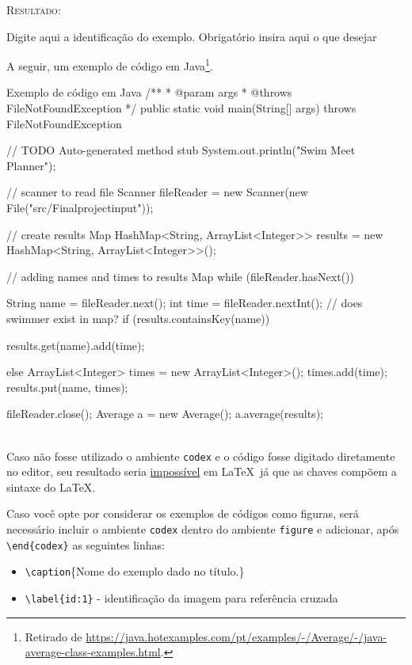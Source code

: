\documentclass[a4paper,12pt,oneside,openright,extrafontsizes,openbib]{memoir}
\begin{document}
{\textsc{Resultado:}

\begin{codex}{Digite aqui a identificação do exemplo. Obrigatório}
	insira aqui o que desejar
\end{codex}

A seguir, um exemplo de código em Java\footnote{Retirado de \url{https://java.hotexamples.com/pt/examples/-/Average/-/java-average-class-examples.html}.}.

\begin{codex}{Exemplo de código em Java}
	/**
	* @param args
	* @throws FileNotFoundException
	*/
	public static void main(String[] args) throws FileNotFoundException {
		// TODO Auto-generated method stub
		System.out.println("Swim Meet Planner");
		
		// scanner to read file
		Scanner fileReader = new Scanner(new File("src/Finalprojectinput"));
		
		// create results Map
		HashMap<String, ArrayList<Integer>> results = new HashMap<String, ArrayList<Integer>>();
		
		// adding names and times to results Map
		while (fileReader.hasNext()) {
			String name = fileReader.next();
			int time = fileReader.nextInt();
			// does swimmer exist in map?
			if (results.containsKey(name)) {
				results.get(name).add(time);
				
			} else {
				ArrayList<Integer> times = new ArrayList<Integer>();
				times.add(time);
				results.put(name, times);
			}
		}
		fileReader.close();
		Average a = new Average();
		a.average(results);
	}
\end{codex}
\ \\

Caso não fosse utilizado o ambiente \verb|codex| e o código fosse digitado diretamente no editor, seu resultado seria \underline{impossível} em \LaTeX\ já que as chaves compõem a sintaxe do \LaTeX.


Caso você opte por considerar os exemplos de códigos como figuras, será necessário incluir o ambiente \verb|codex| dentro do ambiente \verb|figure| e adicionar, após \verb|\end{codex}| as seguintes linhas:

\begin{itemize}
	\item \verb|\caption|\{Nome do exemplo dado no título.\}
	\item \verb|\label{id:1}| - identificação da imagem para referência cruzada
\end{itemize}

}
\end{document}
